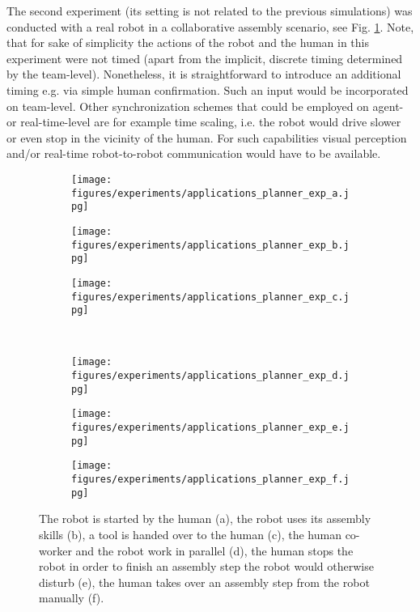 The second experiment (its setting is not related to the previous simulations) was conducted with a real robot in a collaborative assembly scenario, see Fig. \ref{fig:applications:planner:exp}.
Note, that for sake of simplicity the actions of the robot and the human in this experiment were not timed (apart from the implicit, discrete timing determined by the team-level).
Nonetheless, it is straightforward to introduce an additional timing e.g. via simple human confirmation.
Such an input would be incorporated on team-level.
Other synchronization schemes that could be employed on agent- or real-time-level are for example time scaling, i.e. the robot would drive slower or even stop in the vicinity of the human.
For such capabilities visual perception and/or real-time robot-to-robot communication would have to be available. 

\begin{figure}[ht!]
\begin{subfigure}{0.3\textwidth}
\texttt{[image: figures/experiments/applications\_planner\_exp\_a.jpg]}
\subcaption{}
\end{subfigure}
\begin{subfigure}{0.3\textwidth}
\texttt{[image: figures/experiments/applications\_planner\_exp\_b.jpg]}
\subcaption{}
\end{subfigure}
\begin{subfigure}{0.3\textwidth}
\texttt{[image: figures/experiments/applications\_planner\_exp\_c.jpg]}
\subcaption{}
\end{subfigure}
\\
\begin{subfigure}{0.3\textwidth}
\texttt{[image: figures/experiments/applications\_planner\_exp\_d.jpg]}
\subcaption{}
\end{subfigure}
\begin{subfigure}{0.3\textwidth}
\texttt{[image: figures/experiments/applications\_planner\_exp\_e.jpg]}
\subcaption{}
\end{subfigure}
\begin{subfigure}{0.3\textwidth}
\texttt{[image: figures/experiments/applications\_planner\_exp\_f.jpg]}
\subcaption{}
\end{subfigure}
\caption{The robot is started by the human (a), the robot uses its assembly skills (b), a tool is handed over to the human (c), the human co-worker and the robot work in parallel (d), the human stops the robot in order to finish an assembly step the robot would otherwise disturb (e), the human takes over an assembly step from the robot manually (f).}
\label{fig:applications:planner:exp}
\end{figure}


